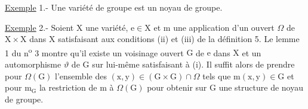 \uline{Exemple} 1.- Une variété de groupe est un noyau de groupe.

\uline{Exemple} 2.- Soient $\mathrm X$ une variété, $\mathrm e\in\mathrm X$ et $\mathrm m$ une application d'un ouvert $\Omega$ de $\mathrm X\times\mathrm X$ dans $\mathrm X$ satisfaisant aux conditions (ii) et (iii) de la définition 5. Le lemme 1 du n\textsuperscript{o} 3 montre qu'il existe un voisinage ouvert $\mathrm G$ de $\mathrm e$ dans $\mathrm X$ et un automorphisme $\vartheta$ de $\mathrm G$ sur lui-même satisfaisant à (i). Il suffit alors de prendre pour $\Omega(\mathrm G)$ l'ensemble des $(\mathrm x,\mathrm y)\in(\mathrm G\times\mathrm G)\cap\Omega$ tels que $\mathrm m(\mathrm x,\mathrm y)\in\mathrm G$ et pour $\mathrm m_{\mathrm G}$ la restriction de $\mathrm m$ à $\Omega(\mathrm G)$ pour obtenir sur $\mathrm G$ une structure de noyau de groupe.

